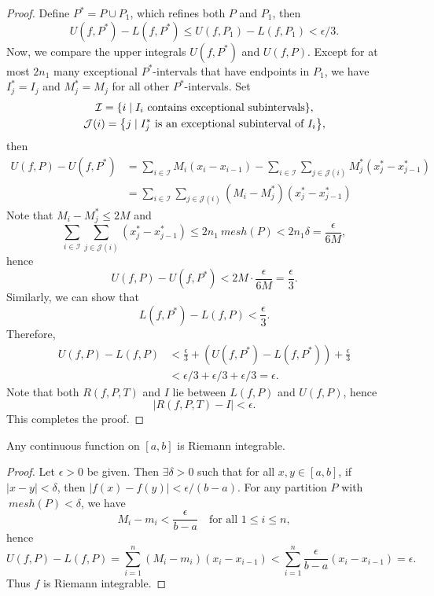 \begin{thm}
\begin{proof}
        Define $P^* = P \cup P_1$, which refines both $P$ and $P_1$, then
        \[
        U(f, P^*) - L(f, P^*) \leq U(f, P_1) - L(f, P_1) < \epsilon/3.
        \]
        Now, we compare the upper integrals $U(f, P^*)$ and $U(f, P)$. Except for at most $2n_1$ many exceptional $P^*$-intervals that have endpoints in $P_1$, we have $I_j^* = I_j$ and $M_j^* = M_j$ for all other $P^*$-intervals. Set
        \begin{gather*}
            \mathcal I = {\left\{{i \mid I_i \text{ contains exceptional subintervals}}\right\}}, \\
            \mathcal J(i) = {\left\{{j \mid I_j^* \text{ is an exceptional subinterval of } I_i}\right\}},
        \end{gather*}
        then
        \begin{align*}
            U(f, P) - U(f, P^*) &= \sum_{i \in \mathcal I} M_i(x_i - x_{i-1}) - \sum_{i \in \mathcal I} \sum_{j \in \mathcal J(i)} M_j^*(x_j^* - x_{j-1}^*) \\
            &= \sum_{i \in \mathcal I} \sum_{j \in \mathcal J(i)} (M_i - M_j^*)(x_j^* - x_{j-1}^*)
        \end{align*}
        Note that $M_i - M_j^* \leq 2M$ and
        \[
        \sum_{i \in \mathcal I} \sum_{j \in \mathcal J(i)} (x_j^* - x_{j-1}^*) \leq 2n_1 ~mesh(P) < 2n_1 \delta = \frac{\epsilon}{6M},
        \]
        hence
        \[
        U(f, P) - U(f, P^*) < 2M \cdot \frac{\epsilon}{6M} = \frac{\epsilon}{3}.
        \]
        Similarly, we can show that
        \[
        L(f, P^*) - L(f, P) < \frac{\epsilon}{3}.
        \]
        Therefore,
        \begin{align*}
            U(f, P) - L(f, P) &< \frac{\epsilon}{3} + (U(f, P^*) - L(f, P^*)) + \frac{\epsilon}{3} \\
            &< \epsilon/3 + \epsilon/3 + \epsilon/3 = \epsilon.
        \end{align*}
        Note that both $R(f, P, T)$ and $I$ lie between $L(f, P)$ and $U(f, P)$, hence
        \[
        |R(f, P, T) - I| < \epsilon.
        \]
        This completes the proof.
    \end{proof}
\end{thm}

\begin{ex}
    Any continuous function on $[a, b]$ is Riemann integrable.
    \begin{proof}
        Let $\epsilon > 0$ be given. Then $\exists \delta > 0$ such that for all $x, y \in [a, b]$, if $|x - y| < \delta$, then $|f(x) - f(y)| < \epsilon/(b - a)$. For any partition $P$ with $~mesh(P) < \delta$, we have
        \[
        M_i - m_i < \frac{\epsilon}{b - a} \quad \text{for all } 1 \leq i \leq n,
        \]
        hence
        \[
        U(f, P) - L(f, P) = \sum_{i=1}^n (M_i - m_i)(x_i - x_{i-1}) < \sum_{i=1}^n \frac{\epsilon}{b - a} (x_i - x_{i-1}) = \epsilon.
        \]
        Thus $f$ is Riemann integrable.
    \end{proof}
\end{ex}


